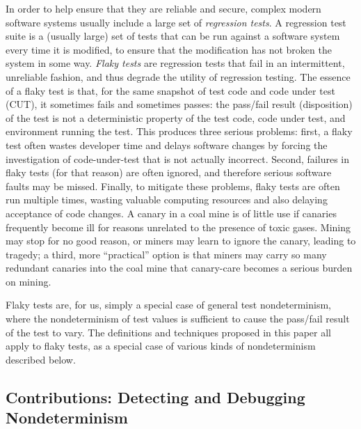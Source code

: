 In order to help ensure that they are reliable and secure, complex
modern software systems usually include a large set of
\emph{regression tests}.  A regression test suite is a (usually large)
set of tests that can be run against a software system every time it
is modified, to ensure that the modification has not broken the system
in some way.  \emph{Flaky tests} \cite{miccoflaky} are regression
tests that fail in an intermittent, unreliable fashion, and thus
degrade the utility of regression testing.  The essence of a flaky
test is that, for the same snapshot of test code and code under test
(CUT), it sometimes fails and sometimes passes: the pass/fail result (disposition) of the
test is not a deterministic property of the test code, code under
test, and environment running the test.  This produces three serious
problems: first, a flaky test often wastes developer time and delays
software changes by forcing the investigation of code-under-test that
is not actually incorrect.  Second, failures in flaky tests (for that
reason) are often ignored, and therefore serious software faults may
be missed.  Finally, to mitigate these problems, flaky tests are often
run multiple times, wasting valuable computing resources and also
delaying acceptance of code changes.  A canary in a coal mine is of
little use if canaries frequently become ill for reasons unrelated to
the presence of toxic gases.  Mining may stop for no good reason, or
miners may learn to ignore the canary, leading to tragedy; a third,
more ``practical'' option is that miners may carry so many redundant
canaries into the coal mine that canary-care becomes a serious burden
on mining.

Flaky tests are, for us, simply a special case of general test
nondeterminism, where the nondeterminism of test values is sufficient
to cause the pass/fail result of the test to vary.  The definitions
and techniques proposed in this paper all apply to flaky tests, as a
special case of various kinds of nondeterminism described below.

\subsection{Contributions:  Detecting and Debugging Nondeterminism}


